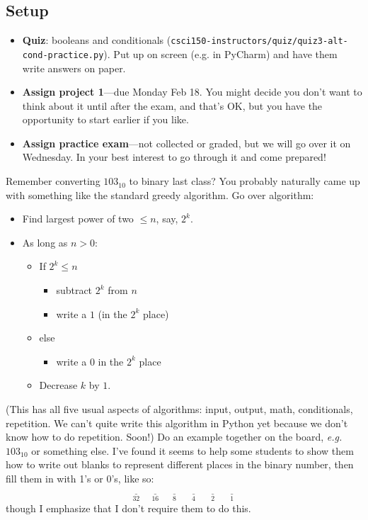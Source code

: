 \documentclass{article}
\newcommand{\eg}{\emph{e.g.}\xspace}
\newcommand{\ready}{\textcolor{Green}{\Checkmark}\xspace}
\begin{document}
\subsection*{Setup}
\begin{itemize}
\item \ready \textbf{Quiz}: booleans and conditionals
  (\texttt{csci150-instructors/quiz/quiz3-alt-cond-practice.py}).  Put
  up on screen (e.g. in PyCharm) and have them write answers on paper.
\item \ready \textbf{Assign project 1}---due Monday Feb 18.  You might
  decide you don't want to think about it until after the exam, and
  that's OK, but you have the opportunity to start earlier if you
  like.
\item \ready \textbf{Assign practice exam}---not collected or graded, but we
  will go over it on Wednesday.  In your best interest to go through
  it and come prepared!
\end{itemize}

Remember converting $103_{10}$ to binary last class?  You probably
naturally came up with something like the standard greedy algorithm.
Go over algorithm:

\begin{itemize}
\item Find largest power of two $\leq n$, say, $2^k$.
\item As long as $n > 0$:
  \begin{itemize}
  \item If $2^k \leq n$
    \begin{itemize}
    \item subtract $2^k$ from $n$
    \item write a $1$ (in the $2^k$ place)
    \end{itemize}
  \item else
    \begin{itemize}
    \item  write a $0$ in the $2^k$ place
    \end{itemize}
  \item Decrease $k$ by $1$.
  \end{itemize}
\end{itemize}

(This has all five usual aspects of algorithms: input, output, math,
conditionals, repetition.  We can't quite write this algorithm in
Python yet because we don't know how to do repetition.  Soon!)  Do an
example together on the board, \eg $103_{10}$ or something else. I've
found it seems to help some students to show them how to write out
blanks to represent different places in the binary number, then fill
them in with 1's or 0's, like so:
\[ \underset{32}{\underline{\phantom{XX}}} \; \underset{16}{\underline{\phantom{XX}}} \; \underset{8}{\underline{\phantom{XX}}} \; \underset{4}{\underline{\phantom{XX}}} \; \underset{2}{\underline{\phantom{XX}}} \; \underset{1}{\underline{\phantom{XX}}} \]
though I emphasize that I don't require them to do this.
\end{document}
